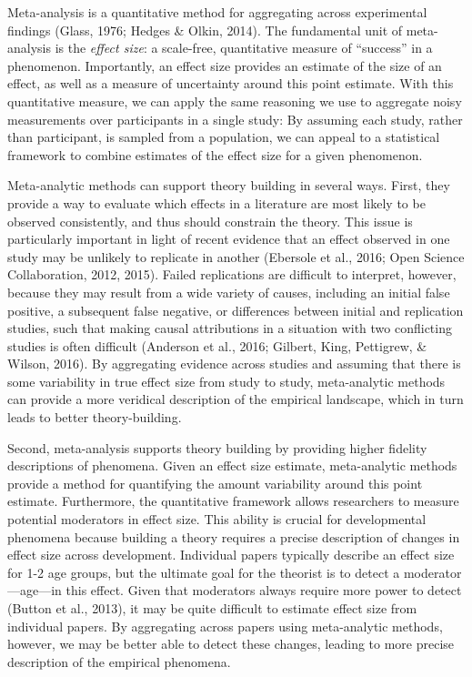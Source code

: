 \documentclass[english,floatsintext,man]{apa6}
\theoremstyle{definition}
\theoremstyle{definition}
\theoremstyle{remark}
\begin{document}
Meta-analysis is a quantitative method for aggregating across
experimental findings (Glass, 1976; Hedges \& Olkin, 2014). The
fundamental unit of meta-analysis is the \emph{effect size}: a
scale-free, quantitative measure of \enquote{success} in a phenomenon.
Importantly, an effect size provides an estimate of the size of an
effect, as well as a measure of uncertainty around this point estimate.
With this quantitative measure, we can apply the same reasoning we use
to aggregate noisy measurements over participants in a single study: By
assuming each study, rather than participant, is sampled from a
population, we can appeal to a statistical framework to combine
estimates of the effect size for a given phenomenon.

Meta-analytic methods can support theory building in several ways.
First, they provide a way to evaluate which effects in a literature are
most likely to be observed consistently, and thus should constrain the
theory. This issue is particularly important in light of recent evidence
that an effect observed in one study may be unlikely to replicate in
another (Ebersole et al., 2016; Open Science Collaboration, 2012, 2015).
Failed replications are difficult to interpret, however, because they
may result from a wide variety of causes, including an initial false
positive, a subsequent false negative, or differences between initial
and replication studies, such that making causal attributions in a
situation with two conflicting studies is often difficult (Anderson et
al., 2016; Gilbert, King, Pettigrew, \& Wilson, 2016). By aggregating
evidence across studies and assuming that there is some variability in
true effect size from study to study, meta-analytic methods can provide
a more veridical description of the empirical landscape, which in turn
leads to better theory-building.

Second, meta-analysis supports theory building by providing higher
fidelity descriptions of phenomena. Given an effect size estimate,
meta-analytic methods provide a method for quantifying the amount
variability around this point estimate. Furthermore, the quantitative
framework allows researchers to measure potential moderators in effect
size. This ability is crucial for developmental phenomena because
building a theory requires a precise description of changes in effect
size across development. Individual papers typically describe an effect
size for 1-2 age groups, but the ultimate goal for the theorist is to
detect a moderator---age---in this effect. Given that moderators always
require more power to detect (Button et al., 2013), it may be quite
difficult to estimate effect size from individual papers. By aggregating
across papers using meta-analytic methods, however, we may be better
able to detect these changes, leading to more precise description of the
empirical phenomena.
\end{document}
